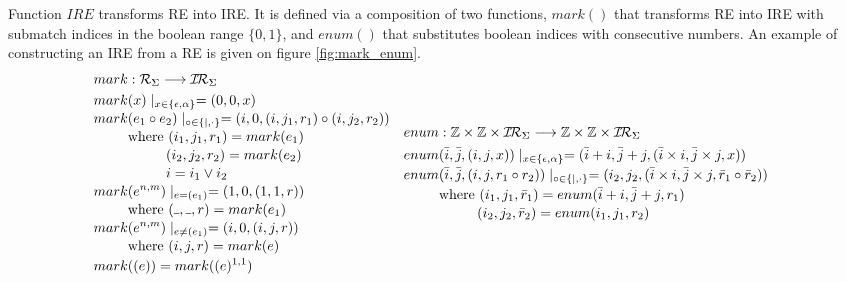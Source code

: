 \documentclass[AMA,STIX1COL]{WileyNJD-v2}
\newcommand{\Xund}{\rule{.4em}{.4pt}}
\newcommand{\XI}{\mathcal{I}}
\newcommand{\XIR}{\XI\!\XR}
\newcommand{\XR}{\mathcal{R}}
\newcommand{\YZ}{\mathbb{Z}}
\newcommand{\IRE}{I\!RE}
\begin{document}
Function $\IRE$ transforms RE into IRE.
It is defined via a composition of two functions,
$mark()$ that transforms RE into IRE with submatch indices in the boolean range $\{0, 1\}$,
and $enum()$ that substitutes boolean indices with consecutive numbers.
An example of constructing an IRE from a RE is given on figure \ref{fig:mark_enum}.
%
    \begin{align*}
    &\begin{aligned}
        mark &: \XR_\Sigma \longrightarrow \XIR_\Sigma \\
        mark &(x) \mid_{x \in \{\epsilon, \alpha\}} = (0, 0, x) \\[-0.2em]
        mark &(e_1 \circ e_2) \mid_{\circ \in \{|,\cdot\}} = (i, 0,
            (i, j_1, r_1) \circ
            (i, j_2, r_2)
            ) \\[-0.2em]
            &\text{where }            (i_1, j_1, r_1) = mark(e_1) \\[-0.2em]
            &\space{\hphantom{where }}(i_2, j_2, r_2) = mark(e_2) \\[-0.2em]
            &\space{\hphantom{where }}i = i_1 \vee i_2 \\[-0.2em]
        mark &(e^{n, m}) \mid_{e = (e_1)} = (1, 0, (1, 1, r)) \\[-0.2em]
            &\text{where } (\Xund, \Xund, r) = mark(e_1) \\[-0.2em]
        mark &(e^{n, m}) \mid_{e \neq (e_1)} = (i, 0, (i, j, r)) \\[-0.2em]
            &\text{where } (i, j, r) = mark(e) \\[-0.2em]
        mark &((e)) = mark((e)^{1, 1})
    \end{aligned}
    &&\begin{aligned}
        enum &: \YZ \times \YZ \times \XIR_\Sigma \longrightarrow \YZ \times \YZ \times \XIR_\Sigma \\
        enum &(\bar{i}, \bar{j}, (i, j, x)) \mid_{x \in \{\epsilon, \alpha\}}
            = (\bar{i} + i, \bar{j} + j, (\bar{i} \times i, \bar{j} \times j, x))
        \\[-0.2em]
        enum &(\bar{i}, \bar{j}, (i, j, r_1 \circ r_2)) \mid_{\circ \in \{|,\cdot\}}
            = (i_2, j_2, (\bar{i} \times i, \bar{j} \times j, \bar{r}_1 \circ \bar{r}_2)) \\[-0.2em]
            &\text{where }            (i_1, j_1, \bar{r}_1) = enum(\bar{i} + i, \bar{j} + j, r_1) \\[-0.2em]
            &\space{\hphantom{where }}(i_2, j_2, \bar{r}_2) = enum(i_1, j_1, r_2)

\end{aligned}
\end{align*}
\end{document}
